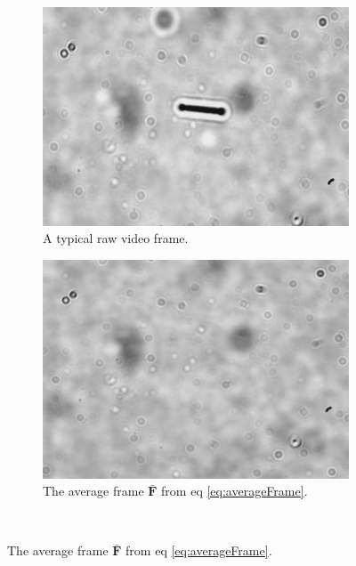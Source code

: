 \begin{figure}[H]
\centering
\begin{subfigure}[3a]{0.40\textwidth}
\includegraphics[width=\textwidth]{figures/method/static1.png}
\caption{A typical raw video frame.}\label{fig:origFrame}
\end{subfigure}\hspace{1em}%
\begin{subfigure}[3b]{0.40\textwidth}
\includegraphics[width=\textwidth]{figures/method/static3.png}
\caption{The average frame $\bar{\mathbf{F}}$ from eq \ref{eq:averageFrame}.}\label{fig:averageFrame}
\end{subfigure} \\


\end{figure}
